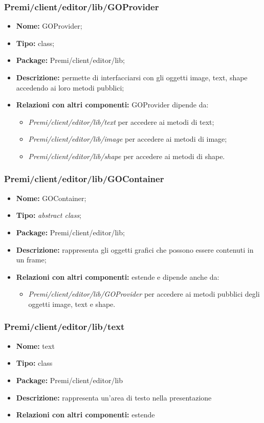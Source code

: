 \subsubsection{Premi/client/editor/lib/GOProvider}
\begin{itemize}
  \item[] \textbf{Nome:} GOProvider;
  \item[] \textbf{Tipo:} class;
  \item[] \textbf{Package:} Premi/client/editor/lib;
  \item[] \textbf{Descrizione:} permette di interfacciarsi con gli oggetti image, text, shape accedendo ai loro metodi pubblici;
  \item[] \textbf{Relazioni con altri componenti:} GOProvider dipende da:
  \begin{itemize}
  	\item \textit{Premi/client/editor/lib/text} per accedere ai metodi di text;
  	\item \textit{Premi/client/editor/lib/image} per accedere ai metodi di image;
  	\item \textit{Premi/client/editor/lib/shape} per accedere ai metodi di shape.
  \end{itemize}
\end{itemize}
\subsubsection{Premi/client/editor/lib/GOContainer}
\begin{itemize}
  \item[] \textbf{Nome:} GOContainer;
  \item[] \textbf{Tipo:} \textit{abstract class};
  \item[] \textbf{Package:} Premi/client/editor/lib;
  \item[] \textbf{Descrizione:} rappresenta gli oggetti grafici che possono essere contenuti in un frame; 
  \item[] \textbf{Relazioni con altri componenti:} estende  e dipende anche da:
  \begin{itemize} 
	\item \textit{Premi/client/editor/lib/GOProvider} per accedere ai metodi pubblici degli oggetti image, text e shape.
\end{itemize}  
\end{itemize}
\subsubsection{Premi/client/editor/lib/text}
\begin{itemize}
  \item[] \textbf{Nome:} text
  \item[] \textbf{Tipo:} class
  \item[] \textbf{Package:} Premi/client/editor/lib
  \item[] \textbf{Descrizione:} rappresenta un'area di testo nella presentazione
  \item[] \textbf{Relazioni con altri componenti:} estende 
\end{itemize}
